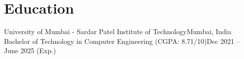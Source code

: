 \section{Education}
\resumeSubHeadingListStart
\resumeSubheading
{University of Mumbai - Sardar Patel Institute of Technology}{Mumbai, India}
{Bachelor of Technology in Computer Engineering (CGPA: 8.71/10)}{Dec 2021 -- June 2025 (Exp.)}{}
\resumeSubHeadingListEnd